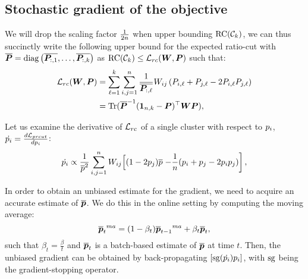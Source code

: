 \subsection{Stochastic gradient of the objective}

We will drop the scaling factor ${\frac{1}{2n}}$ when upper bounding $\operatorname*{RC}({\mathcal{C}}_k)$, we can
thus succinctly write the following upper bound for the expected ratio-cut with
$\overline{{\bm{P}}} = \mathop{\mathrm{diag}} \left(\overline{{\bm{P}}_{:,1}},\ldots,\overline{{\bm{P}}_{:,k}}\right)$ as $\operatorname*{RC}({\mathcal{C}}_k) \leq
{\mathcal{L}}_{rc}({\bm{W}}, {\bm{P}})$ such that:
\begin{align}
	\label{eq:quad}
	{\mathcal{L}}_{rc}({\bm{W}}, {\bm{P}})
	 & = \sum_{\ell=1}^k\sum_{i,j=1}^n
	{\frac{1}{\overline{{\bm{P}}_{:,\ell}}}}{W}_{ij}\left({P}_{i,\ell} + {P}_{j,\ell} -2 {P}_{i,\ell}{P}_{j,\ell}\right) \nonumber \\
	 & =\operatorname{Tr}(\overline{{\bm{P}}}^{-1}({\bm{1}}_{n,k}-{\bm{P}})^\top{\bm{W}} {\bm{P}} ),
\end{align}

Let us examine the derivative of ${\mathcal{L}}_{rc}$ of a single cluster with respect to
${p}_i$,$ \dot{p_i}= \frac{d {\mathcal{L}}_{prcut}}{d{p}_i} $:
\begin{align}
	\label{eq:batchgradient}
	\dot{p_i}\propto \by{\ov{p}^2} \sum_{i,j=1}^{n}\emW_{ij}
	\Big[(1 -2p_j)\ov{p}                                       %
		\left. - \by{n}(p_i + p_j  -2 p_i p_j) \right],
\end{align}

In order to obtain an unbiased estimate for the gradient, we need to acquire an
accurate estimate of $\overline{{\bm{p}}}$. We do this in the online setting by computing the
moving average:
\[
	{\overline{{\bm{p}}}_t}^{ma} = (1-\beta_t){\overline{{\bm{p}}}_{t-1}}^{ma} +\beta_t \overline{{\bm{p}}}_t,
\]
such that $\beta_t = \frac{\beta}{t}$ and $\overline{{\bm{p}}}_t$ is a batch-based estimate
  of $\overline{{\bm{p}}}$ at time $t$. Then, the unbiased gradient can be obtained by
  back-propagating $\left[\operatorname{sg}(\dot{p_i})p_i\right]$, with $\operatorname{sg}$ being the
  gradient-stopping operator.

